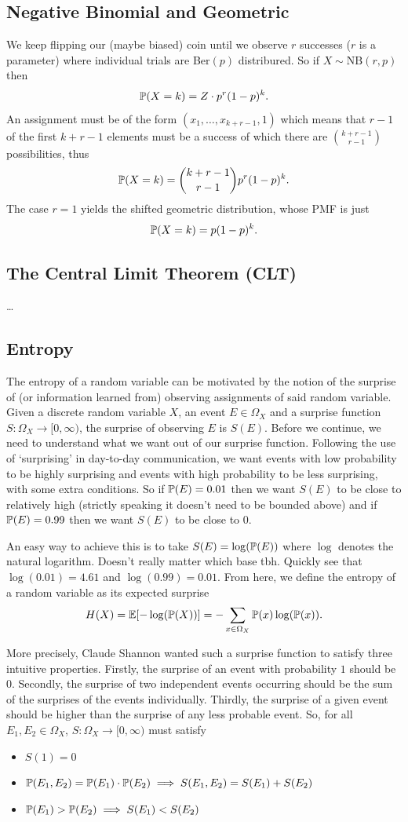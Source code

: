 \documentclass[11pt]{article}
\begin{document}
\begin{appendices}
\subsection{Negative Binomial and Geometric}
We keep flipping our (maybe biased) coin until we observe $r$ successes ($r$ is a parameter) where individual trials are Ber$(p)$ distribured. So if $X\sim\text{NB}(r,p)$ then
$$
\P(X=k)
=
Z\cdot p^r(1-p)^k.
$$
An assignment must be of the form $(x_1,\dots,x_{k+r-1},1)$ which means that $r-1$ of the first $k+r-1$ elements must be a success of which there are $\binom{k+r-1}{r-1}$ possibilities, thus
$$
\P(X=k)
=
\binom{k+r-1}{r-1}p^r(1-p)^k.
$$
The case $r=1$ yields the shifted geometric distribution, whose PMF is just
$$
\P(X=k)
=
p(1-p)^k.
$$

\subsection{The Central Limit Theorem (CLT)}
\dots

\subsection{Entropy}
The entropy of a random variable can be motivated by the notion of the surprise of (or information learned from) observing assignments of said random variable. Given a discrete random variable $X$, an event $E\in\Omega_X$ and a surprise function $S:\Omega_X\rightarrow[0,\infty)$, the surprise of observing $E$ is $S(E)$. Before we continue, we need to understand what we want out of our surprise function. Following the use of `surprising' in day-to-day communication, we want events with low probability to be highly surprising and events with high probability to be less surprising, with some extra conditions. So if $\P(E)=0.01$ then we want $S(E)$ to be close to relatively high (strictly speaking it doesn't need to be bounded above) and if $\P(E)=0.99$ then we want $S(E)$ to be close to 0.

An easy way to achieve this is to take $S(E)=\log(\P(E))$ where $\log$ denotes the natural logarithm. Doesn't really matter which base tbh. Quickly see that $\log(0.01)=4.61$ and $\log(0.99)=0.01$. From here, we define the entropy of a random variable as its expected surprise
$$
H(X)
=
\E[-\log(\P(X))]
=
-\sum_{x\in \Omega_X}\P(x)\log(\P(x)).
$$

\noindent More precisely, Claude Shannon wanted such a surprise function to satisfy three intuitive properties. Firstly, the surprise of an event with probability $1$ should be $0$. Secondly, the surprise of two independent events occurring should be the sum of the surprises of the events individually. Thirdly, the surprise of a given event should be higher than the surprise of any less probable event. So, for all $E_1,E_2\in\Omega_X$, $S:\Omega_X\rightarrow[0,\infty)$ must satisfy
\begin{itemize}
    \item $S(1)=0$
    \item $\P(E_1,E_2)=\P(E_1)\cdot\P(E_2)\implies S(E_1,E_2)=S(E_1)+S(E_2)$
    \item $\P(E_1)>\P(E_2)\implies S(E_1)<S(E_2)$
\end{itemize}


\end{appendices}
\end{document}
